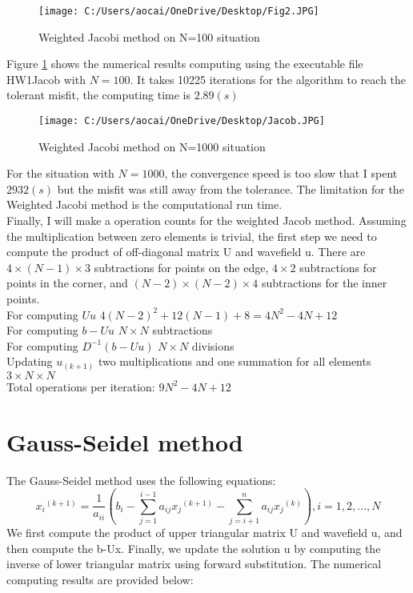\documentclass[12pt]{article}
\begin{document}
\begin{figure}[H]
	\centering
	\texttt{[image: C:/Users/aocai/OneDrive/Desktop/Fig2.JPG]}
	\caption[Optional caption]{Weighted Jacobi method on N=100 situation}
	\label{fig:2}
\end{figure}
Figure \ref{fig:2} shows the numerical results computing using the executable file HW1Jacob with $N=100$. It takes 10225 iterations for the algorithm to reach the tolerant misfit, the computing time is $2.89(s)$

\begin{figure}[H]
	\centering
	\texttt{[image: C:/Users/aocai/OneDrive/Desktop/Jacob.JPG]}
	\caption[Optional caption]{Weighted Jacobi method on N=1000 situation}
	\label{fig:3}
\end{figure}

For the situation with $N=1000$, the convergence speed is too slow that I spent $ 2932 (s)$ but the misfit was still away from the tolerance. The limitation for the Weighted Jacobi method is the computational run time.\\

Finally, I will make a operation counts for the weighted Jacob method. Assuming the multiplication between zero elements is trivial, the first step we need to compute the product of off-diagonal matrix U and wavefield u. There are $4\times(N-1)\times3$ subtractions for points on the edge, $4\times2$ subtractions for points in the corner, and $(N-2)\times(N-2)\times4$ subtractions for the inner points.\\
For computing $Uu$ $4{(N-2)}^2 + 12(N-1) +8 = 4N^2-4N+12 $\\
For computing $b-Uu$ $N \times N$ subtractions\\
For computing $D^{-1}(b-Uu)$ $ N \times N$ divisions \\
Updating $u_{(k+1)}$ two multiplications and one summation for all elements $3\times N\times N$\\
Total operations per iteration: $9N^2 - 4N +12$
 
\section{Gauss-Seidel method}
The Gauss-Seidel method uses the following equations:
$${x_i}^{(k+1)} = \frac{1}{a_{ii}} \left( b_i - \sum_{j=1}^{i-1}a_{ij}{x_j}^{(k+1)} -\sum_{j=i+1}^{n}a_{ij}{x_j}^{(k)} \right), i= 1,2,...,N$$
We first compute the product of upper triangular matrix U and wavefield u, and then compute the b-Ux. Finally, we update the solution u by computing the inverse of lower triangular matrix using forward substitution. The numerical computing results are provided below:
\end{document}
